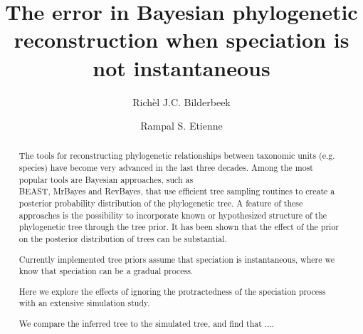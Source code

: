 \documentclass{article}
\title{The error in Bayesian phylogenetic reconstruction when speciation is not instantaneous}
\author[1]{Rich\`el J.C. Bilderbeek}
\author[1]{Rampal S. Etienne}
\affil[1]{Groningen Institute for Evolutionary Life Sciences, University of Groningen, Groningen, The Netherlands}
\begin{document}
\maketitle

\begin{abstract}



  The tools for reconstructing phylogenetic relationships between taxonomic 
  units (e.g. species) have become very advanced in the last three decades. 
  Among the most popular tools are Bayesian approaches, 
  such as \\ BEAST, MrBayes and RevBayes, 
  that use efficient tree sampling routines to create a posterior probability distribution 
  of the phylogenetic tree. 
  A feature of these approaches is the possibility to incorporate known or hypothesized structure of the phylogenetic tree through the tree prior. 
  It has been shown that the effect of the prior on the posterior distribution 
  of trees can be substantial. 

  Currently implemented tree priors assume that speciation is instantaneous,
  where we know that speciation can be a gradual process.

  Here we explore the effects of ignoring 
  the protractedness of the speciation process with an extensive simulation study. 





  We compare the inferred tree to the simulated tree, and find that ....

\end{abstract}
\end{document}
